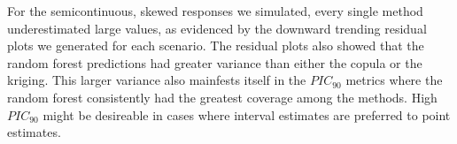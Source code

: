 \documentclass{article}
\begin{document}
For the semicontinuous, skewed responses we simulated, every single method underestimated large values, as evidenced by the downward trending residual plots we generated for each scenario.
The residual plots also showed that the random forest predictions had greater variance than either the copula or the kriging.
This larger variance also mainfests itself in the $PIC_{90}$ metrics where the random forest consistently had the greatest coverage among the methods.
High $PIC_{90}$ might be desireable in cases where interval estimates are preferred to point estimates.

%
\begin{singlespace}
\printbibliography
\end{singlespace}
\end{document}
